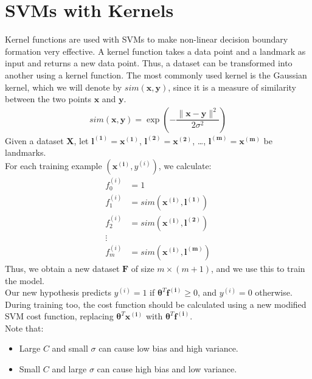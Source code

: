 \documentclass[a4paper, 12pt]{report}
\begin{document}
\section{SVMs with Kernels}
Kernel functions are used with SVMs to make non-linear decision boundary formation very effective. A kernel function takes a data point and a landmark as input and returns a new data point. Thus, a dataset can be transformed into another using a kernel function. The most commonly used kernel is the Gaussian kernel, which we will denote by $sim\left(\bm{x}, \bm{y}\right)$, since it is a measure of similarity between the two points $\bm{x}$ and $\bm{y}$.
\begin{align*}
sim\left(\bm{x}, \bm{y}\right) = \exp\left(-\dfrac{\lVert \bm{x}-\bm{y} \rVert^2}{2\sigma^2}\right)
\end{align*}
Given a dataset $\bm{X}$, let $\bm{l^{(1)}} = \bm{x^{(1)}}$, $\bm{l^{(2)}} = \bm{x^{(2)}}$, \dots, $\bm{l^{(m)}} = \bm{x^{(m)}}$ be landmarks. \\
For each training example $\left(\bm{x^{\left(i\right)}}, y^{\left(i\right)}\right)$, we calculate:
\begin{align*}
f_0^{\left(i\right)} &= 1 \\
f_1^{\left(i\right)} &= sim\left(\bm{x^{\left(i\right)}}, \bm{l^{\left(1\right)}}\right) \\
f_2^{\left(i\right)} &= sim\left(\bm{x^{\left(i\right)}}, \bm{l^{\left(2\right)}}\right) \\
\vdots & \\
f_m^{\left(i\right)} &= sim\left(\bm{x^{\left(i\right)}}, \bm{l^{\left(m\right)}}\right)
\end{align*}
Thus, we obtain a new dataset $\bm{F}$ of size $m\times(m+1)$, and we use this to train the model. \\
Our new hypothesis predicts $y^{\left(i\right)} = 1$ if $\bm{\theta}^T\bm{f^{\left(i\right)}} \geq 0$, and $y^{\left(i\right)} = 0$ otherwise. \\
During training too, the cost function should be calculated using a new modified SVM cost function, replacing $\bm{\theta}^T\bm{x^{\left(i\right)}}$ with $\bm{\theta}^T\bm{f^{\left(i\right)}}$. \\
\break
Note that:
\begin{itemize}
\item Large $C$ and small $\sigma$ can cause low bias and high variance.
\item Small $C$ and large $\sigma$ can cause high bias and low variance.
\end{itemize}
\end{document}
